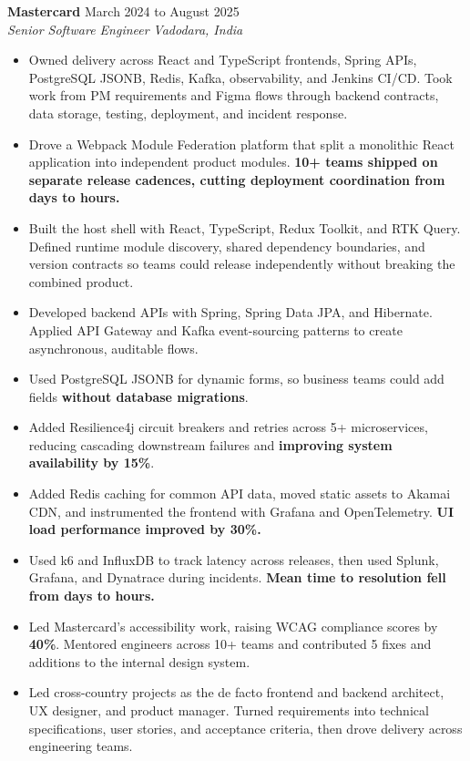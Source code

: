 \documentclass[a4paper,10pt]{article}
\newcommand{\role}[4]{
  \needspace{4\baselineskip}
  \textbf{\color{accent}#1} \hfill {\small #2}\\[-1pt]
  \textit{#3} \hfill {\small\textit{#4}}
}
\begin{document}
\role{Mastercard}{March 2024 to August 2025}{Senior Software Engineer}{Vadodara, India}
\begin{itemize}
  \item Owned delivery across React and TypeScript frontends, Spring APIs, PostgreSQL JSONB, Redis, Kafka, observability, and Jenkins CI/CD. Took work from PM requirements and Figma flows through backend contracts, data storage, testing, deployment, and incident response.
  \item Drove a Webpack Module Federation platform that split a monolithic React application into independent product modules. \textbf{10+ teams shipped on separate release cadences, cutting deployment coordination from days to hours.}
  \item Built the host shell with React, TypeScript, Redux Toolkit, and RTK Query. Defined runtime module discovery, shared dependency boundaries, and version contracts so teams could release independently without breaking the combined product.
  \item Developed backend APIs with Spring, Spring Data JPA, and Hibernate. Applied API Gateway and Kafka event-sourcing patterns to create asynchronous, auditable flows.
  \item Used PostgreSQL JSONB for dynamic forms, so business teams could add fields \textbf{without database migrations}.
  \item Added Resilience4j circuit breakers and retries across 5+ microservices, reducing cascading downstream failures and \textbf{improving system availability by 15\%}.
  \item Added Redis caching for common API data, moved static assets to Akamai CDN, and instrumented the frontend with Grafana and OpenTelemetry. \textbf{UI load performance improved by 30\%.}
  \item Used k6 and InfluxDB to track latency across releases, then used Splunk, Grafana, and Dynatrace during incidents. \textbf{Mean time to resolution fell from days to hours.}
  \item Led Mastercard's accessibility work, raising WCAG compliance scores by \textbf{40\%}. Mentored engineers across 10+ teams and contributed 5 fixes and additions to the internal design system.
  \item Led cross-country projects as the de facto frontend and backend architect, UX designer, and product manager. Turned requirements into technical specifications, user stories, and acceptance criteria, then drove delivery across engineering teams.
\end{itemize}
\end{document}
